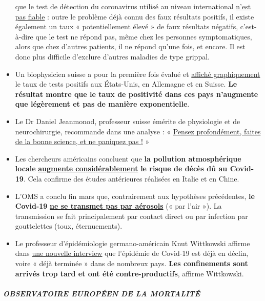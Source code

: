 \begin{itemize}
  que le test de détection du coronavirus utilisé au niveau
  international
  \href{https://www.ncbi.nlm.nih.gov/pubmed/32219885}{n'est pas fiable}
  : outre le problème déjà connu des faux résultats positifs, il existe
  également un taux « potentiellement élevé » de faux résultats
  négatifs, c'est-à-dire que le test ne répond pas, même chez les
  personnes symptomatiques, alors que chez d'autres patients, il ne
  répond qu'une fois, et encore. Il est donc plus difficile d'exclure
  d'autres maladies de type grippal.
\item
  Un biophysicien suisse a pour la première fois évalué et
  \href{https://swprs.org/rate-of-positive-covid19-tests/}{affiché
  graphiquement} le taux de tests positifs aux États-Unis, en Allemagne
  et en Suisse. \textbf{Le résultat montre que le taux de positivité
  dans ces pays n'augmente que légèrement et pas de manière
  exponentielle}.
\item
  Le Dr Daniel Jeanmonod, professeur suisse émérite de physiologie et de
  neurochirurgie, recommande dans une analyse : «
  \href{https://off-guardian.org/2020/04/07/think-deep-do-good-science-and-do-not-panic/}{Pensez
  profondément, faites de la bonne science, et ne paniquez pas !} »
\item
  Les chercheurs américains concluent que \textbf{la pollution
  atmosphérique locale}
  \href{https://www.medrxiv.org/content/10.1101/2020.04.05.20054502v1}{\textbf{augmente
  considérablement}} \textbf{le risque de décès dû au Covid-19}. Cela
  confirme des études antérieures réalisées en Italie et en Chine.
\item
  L'OMS a conclu fin mars que, contrairement aux hypothèses précédentes,
  \textbf{le Covid-19}
  \href{https://www.who.int/news-room/commentaries/detail/modes-of-transmission-of-virus-causing-covid-19-implications-for-ipc-precaution-recommendations}{\textbf{ne
  se transmet pas par aérosols}} (« par l'air »). La transmission se
  fait principalement par contact direct ou par infection par
  gouttelettes (toux, éternuements).
\item
  Le professeur d'épidémiologie germano-américain Knut Wittkowski
  affirme dans \href{https://www.youtube.com/watch?v=ARTf4bpiXuI}{une
  nouvelle interview} que l'épidémie de Covid-19 est déjà en déclin,
  voire « déjà terminée » dans de nombreux pays. \textbf{Les
  confinements sont arrivés trop tard et ont été contre-productifs},
  affirme Wittkowski.
\end{itemize}

\hypertarget{observatoire-europuxe9en-de-la-mortalituxe9}{%
\subparagraph{\texorpdfstring{\textbf{OBSERVATOIRE EUROPÉEN DE LA
MORTALITÉ}}{OBSERVATOIRE EUROPÉEN DE LA MORTALITÉ}}\label{observatoire-europuxe9en-de-la-mortalituxe9}}

